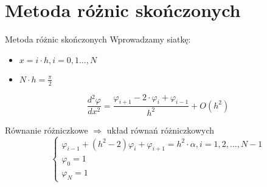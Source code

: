\section{Metoda różnic skończonych}

	\begin{frame}{Metoda różnic skończonych}
		Wprowadzamy siatkę:
		\begin{itemize}
			\item $x = i \cdot h, i = 0,1 ... , N$					
			\item $N \cdot h = \frac{\pi}{2}$		
		\end{itemize}

		$$\frac{d^2 \varphi}{dx^2} = \frac{\varphi_{i+1} - 2 \cdot \varphi_i + \varphi_{i-1}}{h^2} + O(h^2)$$

		\begin{block}{Równanie różniczkowe $\Rightarrow$ układ równań różniczkowych}
			$$
			\begin{cases}
				\varphi_{i-1} + (h^2 - 2)\varphi_i + \varphi_{i+1} = h^2 \cdot \alpha, i = 1,2, ..., N-1 \\
				\varphi_0 = 1 \\
				\varphi_N = 1
			\end{cases}
			$$
		\end{block}	
	\end{frame}


